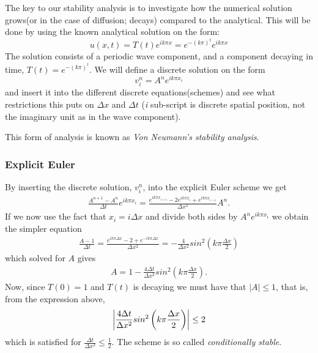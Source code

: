 \documentclass[11pt,a4paper,final]{article}
\numberwithin{equation}{section}
\begin{document}
The key to our stability analysis is to investigate how the numerical solution grows(or in the case of diffusion; decays) compared to the analytical. This will be done by using the known analytical solution on the form:
\begin{equation}
u(x,t) = T(t)e^{ik \pi x} = e^{-(k\pi)^t}e^{ik \pi x}
\end{equation}
The solution consists of a periodic wave component, and a component decaying in time, $T(t)=e^{-(k\pi)^t}$. We will define a discrete solution on the form
\begin{equation}
v^n_i = A^n e^{ik \pi x_i}
\end{equation}
and insert it into the different discrete equations(schemes) and see what restrictions this puts on $\Delta x$ and $\Delta t$ (\emph{i} sub-script is discrete spatial position, not the imaginary unit as in the wave component).

This form of analysis is known as \emph{Von Neumann's stability analysis}.

\subsubsection{Explicit Euler}

By inserting the discrete solution, $v^n_i$, into the explicit Euler scheme we get
\begin{align*}
\frac{A^{n+1}-A^{n}}{\Delta t} e^{ik \pi x_i} = \frac{e^{ik \pi x_{i+1}} -2e^{ik \pi x_i} + e^{ik \pi x_{i-1}}}{\Delta x^2} A^n.
\end{align*}
If we now use the fact that $x_i = i\Delta x$ and divide both sides by $A^n e^{ik \pi x_i}$ we obtain the simpler equation
\begin{align*}
\frac{A-1}{\Delta t} = \frac{e^{ik \pi \Delta x} -2 + e^{-ik \pi \Delta x}}{\Delta x^2} = -\frac{4}{\Delta x^2}sin^2\left(k\pi \frac{\Delta x}{2}\right)
\end{align*}
which solved for $A$ gives
\begin{align*}
A=1-\frac{4\Delta t}{\Delta x^2}sin^2\left(k\pi \frac{\Delta x}{2}\right).
\end{align*}
Now, since $T(0)=1$ and $T(t)$ is decaying we must have that $|A| \leq 1$, that is, from the expression above, 
\begin{align*}
\abs{ \frac{4\Delta t}{\Delta x^2}sin^2\left(k\pi \frac{\Delta x}{2}\right)} \leq 2
\end{align*} 
which is satisfied for $\frac{\Delta t}{\Delta x^2} \leq \frac{1}{2}$. The scheme is so called \emph{conditionally stable}.
\end{document}
